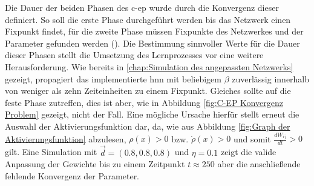 Die Dauer der beiden Phasen des \ac{c-ep} wurde durch die Konvergenz dieser definiert. So soll die erste Phase durchgeführt werden bis das Netzwerk einen Fixpunkt findet, für die zweite Phase müssen Fixpunkte des Netzwerkes und der Parameter gefunden werden (\cite[vgl. S. 3]{Ernoult2020}). Die Bestimmung sinnvoller Werte für die Dauer dieser Phasen stellt die Umsetzung des Lernprozesses vor eine weitere Herausforderung. Wie bereits in \ref{chap:Simulation des angepassten Netzwerks} gezeigt, propagiert das implementierte \ac{hnn} mit beliebigem \(\beta\) zuverlässig innerhalb von weniger als zehn Zeiteinheiten zu einem Fixpunkt. Gleiches sollte auf die feste Phase zutreffen, dies ist aber, wie in Abbildung \ref{fig:C-EP Konvergenz Problem} gezeigt, nicht der Fall. Eine mögliche Ursache hierfür stellt erneut die Auswahl der Aktivierungsfunktion dar, da, wie aus Abbildung \ref{fig:Graph der Aktivierungsfunktion} abzulesen, \(\rho(x) > 0\) bzw. \(\dot{\rho}(x) > 0\) und somit \(\frac{dW_{ij}}{dt} > 0\) gilt. Eine Simulation mit \(\vec{d}=(0.8,0.8,0.8)\) und \(\eta=0.1\) zeigt die valide Anpassung der Gewichte bis zu einem Zeitpunkt \(t\approx250\) aber die anschließende fehlende Konvergenz der Parameter.

